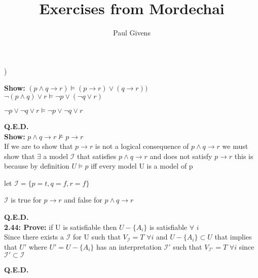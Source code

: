 \documentclass[letterpaper]{article}
\title{Exercises from Mordechai}
\author{Paul Givens}
\begin{document}
) 

\textbf{Show:}
$ (p \wedge q \rightarrow r) \vDash (p \rightarrow r) \vee (q \rightarrow r)) $
\\[1ex]

$ \neg (p \wedge q) \vee r \vDash \neg p \vee (\neg q \vee r) $

$ \neg p \vee \neg q \vee r \vDash \neg p \vee \neg q \vee r $ 

\textbf{Q.E.D.}
\\[1ex]

\textbf{Show:}
$ p \wedge q \rightarrow r \nvDash p \rightarrow r $
\\[1ex]

If we are to show that $ p \rightarrow r $ is not a logical consequence of
$ p \wedge q \rightarrow r $ we must show that $ \exists $ a model
$ \mathscr{I} $ that satisfies $ p \wedge q \rightarrow r $ and does not 
satisfy $ p \rightarrow r $ this is because by definition 
$ U \vDash p $ iff every model U is a model of p 

let $ \mathscr{I} = \{ p = t, q = f, r = f\}$ 

$ \mathscr{I} $ is true for $ p \rightarrow r $ and false for 
$ p \wedge q \rightarrow r $

\textbf{Q.E.D.}
\\[1ex]

\textbf{2.44: Prove:}
if U is satisfiable then $ U - \{A _{i} \} $ is satisfiable $ \forall $ $i$ 
\\[1ex]

Since there exists a $ \mathscr{I} $ for U such that $V_{\mathscr{I}} = T $ 
$\forall i$ and $  U - \{A _{i} \} \subset U$ that implies that $U'$ 
where $U' =  U - \{A _{i} \}$ has an interpretation $\mathscr{I}'$ such that 
$V_{\mathscr{I}'} = T $ $\forall i$ since $\mathscr{I}' \subset \mathscr{I}$

\textbf{Q.E.D.}
\end{document}

